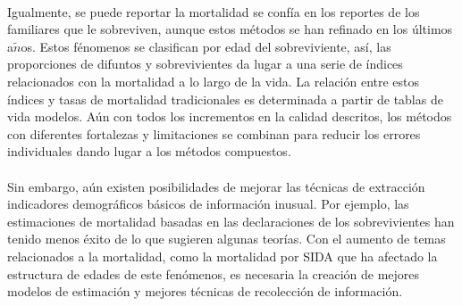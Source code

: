 \documentclass[11pt,spanish,letterpaper]{article}
\theoremstyle{plain}
\begin{document}
\\
Igualmente, se puede reportar la mortalidad se conf\'ia en los reportes de los familiares que le sobreviven, aunque estos m\'etodos se han refinado en los \'ultimos a$\tilde{n}$os. Estos f\'enomenos se clasifican por edad del sobreviviente, as\'i, las proporciones de difuntos y sobrevivientes da lugar a una serie de \'indices relacionados con la mortalidad a lo largo de la vida. La relaci\'on entre estos \'indices y tasas de mortalidad tradicionales es determinada a partir de tablas de vida modelos. A\'un con todos los incrementos en la calidad descritos, los m\'etodos con diferentes fortalezas y limitaciones se combinan para reducir los errores individuales dando lugar a los m\'etodos compuestos.\\
\\
Sin embargo, a\'un existen posibilidades de mejorar las t\'ecnicas de extracci\'on indicadores demogr\'aficos b\'asicos de informaci\'on inusual. Por ejemplo, las estimaciones de mortalidad basadas en las declaraciones de los sobrevivientes han tenido menos \'exito de lo que sugieren algunas teor\'ias. Con el aumento de temas relacionados a la mortalidad, como la mortalidad por SIDA que ha afectado la estructura de edades de este fen\'omenos, es necesaria la creaci\'on de mejores modelos de estimaci\'on y mejores t\'ecnicas de recolecci\'on de informaci\'on. 


\end{document}
